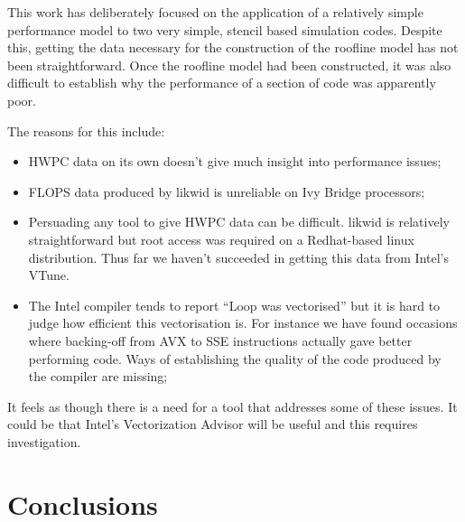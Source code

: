 \documentclass[12pt]{article}
\begin{document}
This work has deliberately focused on the application of a relatively
simple performance model to two very simple, stencil based simulation
codes.  Despite this, getting the data necessary for the construction
of the roofline model has not been straightforward. Once the roofline
model had been constructed, it was also difficult to establish why the
performance of a section of code was apparently poor.

The reasons for this include:
\begin{itemize}
\item HWPC data on its own doesn't give much insight into performance issues;
\item FLOPS data produced by likwid is unreliable on Ivy Bridge processors;
\item Persuading any tool to give HWPC data can be difficult. likwid
  is relatively straightforward but root access was required on a
  Redhat-based linux distribution. Thus far we haven't succeeded in
  getting this data from Intel's VTune.
\item The Intel compiler tends to report ``Loop was vectorised'' but
  it is hard to judge how efficient this vectorisation is. For
  instance we have found occasions where backing-off from AVX to SSE
  instructions actually gave better performing code. Ways of
  establishing the quality of the code produced by the compiler are
  missing;
\end{itemize}

It feels as though there is a need for a tool that addresses some of
these issues. It could be that Intel's Vectorization Advisor will be
useful and this requires investigation.


\section{Conclusions}



\end{document}
